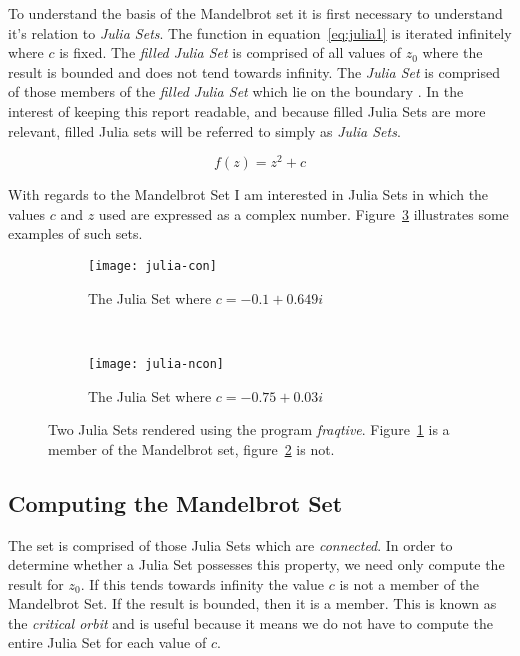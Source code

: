 To understand the basis of the Mandelbrot set it is first necessary to understand it's relation to \textit{Julia Sets}.
The function in equation~\ref{eq:julia1} is iterated infinitely where \(c\) is fixed.
The \textit{filled Julia Set} is comprised of all values of \(z_0\) where the result is bounded and does not tend towards infinity.
The \textit{Julia Set} is comprised of those members of the \textit{filled Julia Set} which lie on the boundary \cite{chaosfract}.
In the interest of keeping this report readable, and because filled Julia Sets are more relevant, filled Julia sets will be 
referred to simply as \textit{Julia Sets}.

\begin{equation}\label{eq:julia1}
f(z) = z^2 + c
\end{equation}

With regards to the Mandelbrot Set I am interested in Julia Sets in which the values \(c\) and \(z\) used are expressed as a complex number. 
Figure~\ref{fig:juliaimgs} illustrates some examples of such sets. 

\begin{figure}[h]
\centering
\begin{subfigure}[b]{0.48\textwidth}
  \centering    
  \texttt{[image: julia-con]}
  \caption{
    \tiny The Julia Set where \(c = -0.1 + 0.649i\)
  }
  \label{fig:juliaimgcon}
\end{subfigure}
~ %
\begin{subfigure}[b]{0.48\textwidth}
  \centering
  \texttt{[image: julia-ncon]}
  \caption{
    \tiny The Julia Set where \(c = -0.75 + 0.03i\)
  }
  \label{fig:juliaimgncon}
\end{subfigure}
\caption{
  Two Julia Sets rendered using the program \textit{fraqtive}\cite{fraqtive}. 
  Figure~\ref{fig:juliaimgcon} is a member of the Mandelbrot set, 
  figure~\ref{fig:juliaimgncon} is not.
}
\label{fig:juliaimgs}
\end{figure}

\subsection*{Computing the Mandelbrot Set}

The set is comprised of those Julia Sets which are \textit{connected}. In order to determine whether a Julia Set possesses this property,
we need only compute the result for \(z_0\). If this tends towards infinity the value \(c\) is not a member of the Mandelbrot Set. If the result
is bounded, then it is a member. This is known as the \textit{critical orbit} and is useful because it means we do not have to compute
the entire Julia Set for each value of \(c\).

